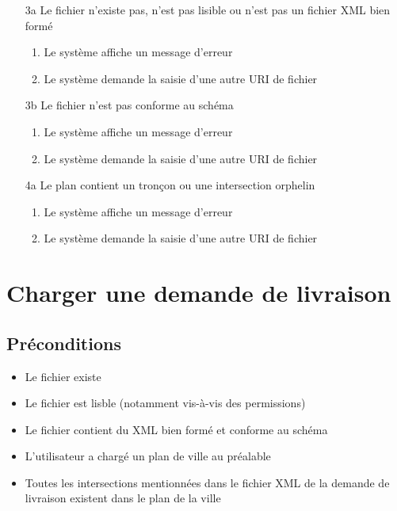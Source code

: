 \begin{itemize}
\item[3a] Le fichier n'existe pas, n'est pas lisible ou n'est pas un fichier XML bien formé
\begin{enumerate}
\item Le système affiche un message d'erreur
\item Le système demande la saisie d'une autre URI de fichier
\end{enumerate}

\item[3b] Le fichier n'est pas conforme au schéma
\begin{enumerate}
\item Le système affiche un message d'erreur
\item Le système demande la saisie d'une autre URI de fichier
\end{enumerate}

\item[4a] Le plan contient un tronçon ou une intersection orphelin
\begin{enumerate}
\item Le système affiche un message d'erreur
\item Le système demande la saisie d'une autre URI de fichier
\end{enumerate}
\end{itemize}

\section{Charger une demande de livraison}

\subsection{Préconditions}

\begin{itemize}
\item Le fichier existe
\item Le fichier est lisble (notamment vis-à-vis des permissions)
\item Le fichier contient du XML bien formé et conforme au schéma
\item L'utilisateur a chargé un plan de ville au préalable
\item Toutes les intersections mentionnées dans le fichier XML de la demande de livraison existent dans le plan de la ville
\end{itemize}

